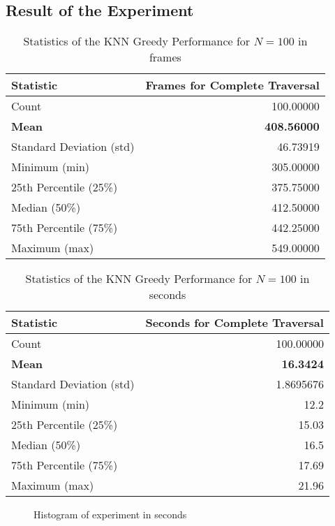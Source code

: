\subsection{Result of the Experiment}
\begin{table}[h!]
\centering
\caption{Statistics of the KNN Greedy Performance for $N=100$ in frames}
\begin{tabular}{lr}
\toprule
Statistic & Frames for Complete Traversal \\
\midrule
Count     & 100.00000 \\
\textbf{Mean}      & \textbf{408.56000} \\
Standard Deviation (std) & 46.73919 \\
Minimum (min)  & 305.00000 \\
25th Percentile (25\%) & 375.75000 \\
Median (50\%)  & 412.50000 \\
75th Percentile (75\%) & 442.25000 \\
Maximum (max)  & 549.00000 \\
\bottomrule
\end{tabular}
\label{table:algorithm_stats}
\end{table}





\begin{table}[h!]
\centering
\caption{Statistics of the KNN Greedy Performance for $N=100$ in seconds}
\begin{tabular}{lr}
\toprule
Statistic & Seconds for Complete Traversal \\
\midrule
Count     & 100.00000 \\
\textbf{Mean}      & \textbf{16.3424} \\
Standard Deviation (std) & 1.8695676\\
Minimum (min)  & 12.2 \\
25th Percentile (25\%) & 15.03 \\
Median (50\%)  & 16.5 \\
75th Percentile (75\%) & 17.69 \\
Maximum (max)  & 21.96 \\
\bottomrule
\end{tabular}
\label{table:algorithm_stats}
\end{table}



\begin{figure}[!ht]
    \centering
    
    \caption{Histogram of experiment in seconds}
    \label{fig:hist_results}
\end{figure}

